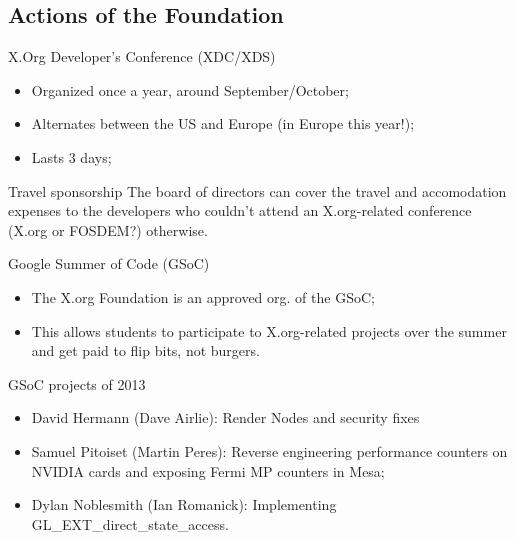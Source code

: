 \documentclass{beamer}
\begin{document}
		\subsection{Actions of the Foundation}
		\begin{frame}
			\begin{block}{X.Org Developer's Conference (XDC/XDS)}
				\begin{itemize}
					\item Organized once a year, around
September/October;
					\item Alternates between the US and
Europe (in Europe this year!);
					\item Lasts 3 days;
				\end{itemize}
			\end{block}

			\begin{block}{Travel sponsorship}
				The board of directors can cover the travel and
accomodation expenses to the developers who couldn't attend an X.org-related
conference (X.org or FOSDEM?) otherwise.
			\end{block}
		\end{frame}

		\begin{frame}
			\begin{block}{Google Summer of Code (GSoC)}
				\begin{itemize}
					\item The X.org Foundation is an
approved org. of the GSoC;
					\item This allows students to participate to
X.org-related projects over the summer and get paid to flip bits, not burgers.
				\end{itemize}
			\end{block}

			\begin{block}{GSoC projects of 2013}
				\begin{itemize}
					\item David Hermann (Dave Airlie):
Render Nodes and security fixes
					\item Samuel Pitoiset (Martin Peres):
Reverse engineering performance counters on NVIDIA cards and exposing Fermi MP
counters in Mesa;
					\item Dylan Noblesmith (Ian Romanick):
Implementing GL\_EXT\_direct\_state\_access.
				\end{itemize}
			\end{block}
		\end{frame}
\end{document}
